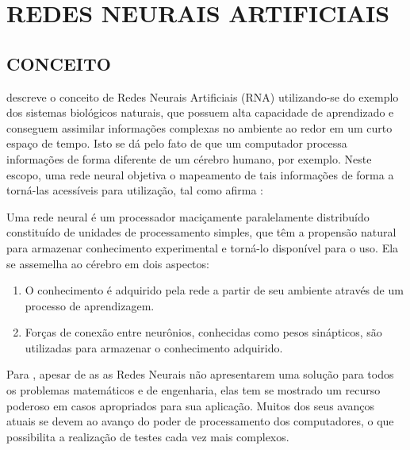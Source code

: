 


\section{REDES NEURAIS ARTIFICIAIS}

\subsection{CONCEITO}

 descreve o conceito de Redes Neurais Artificiais (RNA) utilizando-se do exemplo dos sistemas biológicos naturais, que possuem alta capacidade de aprendizado e conseguem assimilar informações complexas no ambiente ao redor em um curto espaço de tempo. Isto se dá pelo fato de que um computador processa informações de forma diferente de um cérebro humano, por exemplo. Neste escopo, uma rede neural objetiva o mapeamento de tais informações de forma a torná-las acessíveis para utilização, tal como afirma :

\begin{citacao}
	Uma rede neural é um processador maciçamente paralelamente distribuído constituído de unidades de processamento simples, que têm a propensão natural para armazenar conhecimento experimental e torná-lo disponível para o uso. Ela se assemelha ao cérebro em dois aspectos:
	\begin{enumerate}[leftmargin=4.7cm, topsep=0cm]
	    \item O conhecimento é adquirido pela rede a partir de seu ambiente através de um processo de aprendizagem.
	    \item Forças de conexão entre neurônios, conhecidas como pesos sinápticos, são utilizadas para armazenar o conhecimento adquirido.
	\end{enumerate}
\end{citacao}

Para , apesar de as as Redes Neurais não apresentarem uma solução para todos os problemas matemáticos e de engenharia, elas tem se mostrado um recurso poderoso em casos apropriados para sua aplicação. Muitos dos seus avanços atuais se devem ao avanço do poder de processamento dos computadores, o que possibilita a realização de testes cada vez mais complexos.


